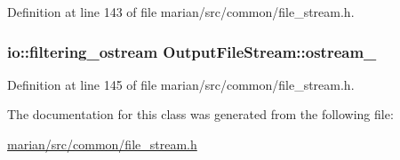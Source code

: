 Definition at line 143 of file marian/src/common/file\+\_\+stream.\+h.

\subsubsection[{\texorpdfstring{ostream\+\_\+}{ostream_}}]{\setlength{\rightskip}{0pt plus 5cm}io\+::filtering\+\_\+ostream Output\+File\+Stream\+::ostream\+\_\+\hspace{0.3cm}{\ttfamily [private]}}\hypertarget{classOutputFileStream_ab2ea25eb576078ee0998e7c53d6034a7}{}\label{classOutputFileStream_ab2ea25eb576078ee0998e7c53d6034a7}


Definition at line 145 of file marian/src/common/file\+\_\+stream.\+h.



The documentation for this class was generated from the following file\+:\begin{DoxyCompactItemize}
\item 
\hyperlink{marian_2src_2common_2file__stream_8h}{marian/src/common/file\+\_\+stream.\+h}\end{DoxyCompactItemize}
